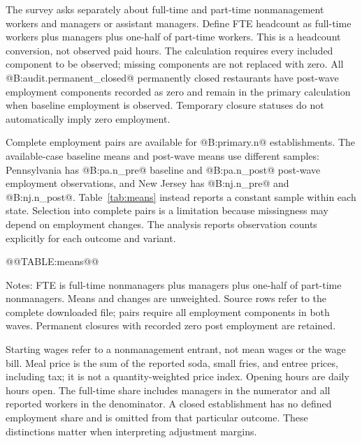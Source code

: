 \documentclass[11pt]{article}
\begin{document}
The survey asks separately about full-time and part-time nonmanagement workers and managers or assistant managers. Define FTE headcount as full-time workers plus managers plus one-half of part-time workers. This is a headcount conversion, not observed paid hours. The calculation requires every included component to be observed; missing components are not replaced with zero. All @B:audit.permanent_closed@ permanently closed restaurants have post-wave employment components recorded as zero and remain in the primary calculation when baseline employment is observed. Temporary closure statuses do not automatically imply zero employment. %

Complete employment pairs are available for @B:primary.n@ establishments. The available-case baseline means and post-wave means use different samples: Pennsylvania has @B:pa.n_pre@ baseline and @B:pa.n_post@ post-wave employment observations, and New Jersey has @B:nj.n_pre@ and @B:nj.n_post@. Table~\ref{tab:means} instead reports a constant sample within each state. Selection into complete pairs is a limitation because missingness may depend on employment changes. The analysis reports observation counts explicitly for each outcome and variant. %

\begin{table}[htbp]\centering
\caption{Employment on a constant restaurant sample}\label{tab:means}
@@TABLE:means@@
\begin{minipage}{.95\linewidth}\small\medskip
Notes: FTE is full-time nonmanagers plus managers plus one-half of part-time nonmanagers. Means and changes are unweighted. Source rows refer to the complete downloaded file; pairs require all employment components in both waves. Permanent closures with recorded zero post employment are retained.
\end{minipage}
\end{table}

Starting wages refer to a nonmanagement entrant, not mean wages or the wage bill. Meal price is the sum of the reported soda, small fries, and entree prices, including tax; it is not a quantity-weighted price index. Opening hours are daily hours open. The full-time share includes managers in the numerator and all reported workers in the denominator. A closed establishment has no defined employment share and is omitted from that particular outcome. These distinctions matter when interpreting adjustment margins. %
\end{document}
